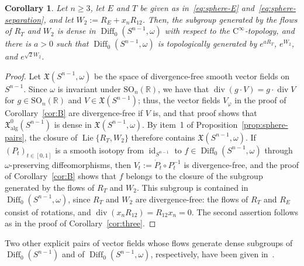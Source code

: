 \documentclass{article}
\newcommand{\R}{\mathbb{R}}
\newcommand{\xalgz}{\mathfrak X^{0}_{\mathrm{alg}}}
\newtheorem{corollary}[theorem]{Corollary}
\theoremstyle{definition}
\theoremstyle{plain}
\begin{document}
\begin{corollary}\label{cor:sphere-flows}
Let $n\geq3$, let $E$ and $T$ be given as in~\eqref{eq:sphere-E} and~\eqref{eq:sphere-separation}, and let $W_2:=R_E+x_nR_{12}$.
Then, the subgroup generated by the flows of $R_T$ and $W_2$ is dense in $\operatorname{Diff}_0(S^{n-1},\omega)$ with respect to the $\mathrm{C}^\infty$-topology, and there is $a>0$ such that $\operatorname{Diff}_0(S^{n-1},\omega)$ is topologically generated by $e^{aR_T}$, $e^{W_2}$, and $e^{\sqrt2W_2}$.
\end{corollary}

\begin{proof}
Let $\mathfrak X(S^{n-1},\omega)$ be the space of divergence-free smooth vector fields on $S^{n-1}$.
Since $\omega$ is invariant under $\mathrm{SO}_n(\R)$, we have that $\operatorname{div}(g\cdot V)=g\cdot\operatorname{div}V$ for $g\in\mathrm{SO}_n(\R)$ and $V\in\mathfrak X(S^{n-1})$; thus, the vector fields $V_\varphi$ in the proof of Corollary~\ref{cor:B} are divergence-free if $V$ is, and that proof shows that $\xalgz(S^{n-1})$ is dense in $\mathfrak X(S^{n-1},\omega)$.
By item~1 of Proposition~\ref{prop:sphere-pairs}, the closure of $\operatorname{Lie}\{R_T,W_2\}$ therefore contains $\mathfrak X(S^{n-1},\omega)$.
If $(P_t)_{t\in[0,1]}$ is a smooth isotopy from $\operatorname{id}_{S^{n-1}}$ to $f\in\operatorname{Diff}_0(S^{n-1},\omega)$ through $\omega$-preserving diffeomorphisms, then $V_t:=\dot P_t\circ P_t^{-1}$ is divergence-free, and the proof of Corollary~\ref{cor:B} shows that $f$ belongs to the closure of the subgroup generated by the flows of $R_T$ and $W_2$.
This subgroup is contained in $\operatorname{Diff}_0(S^{n-1},\omega)$, since $R_T$ and $W_2$ are divergence-free: the flows of $R_T$ and $R_E$ consist of rotations, and $\operatorname{div}(x_nR_{12})=R_{12}x_n=0$.
The second assertion follows as in the proof of Corollary~\ref{cor:three}.
\end{proof}

Two other explicit pairs of vector fields whose flows generate dense subgroups of $\operatorname{Diff}_0(S^{n-1})$ and of $\operatorname{Diff}_0(S^{n-1},\omega)$, respectively, have been given in~\cite[Theorem~1]{DeTurck}.
\end{document}
